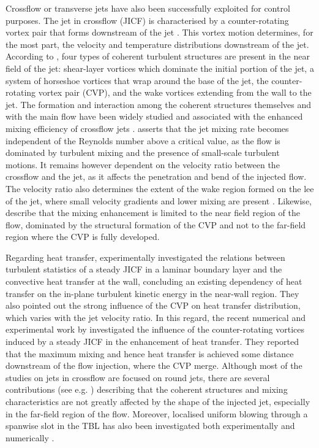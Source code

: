 Crossflow or transverse jets have also been successfully exploited for control purposes. The jet in crossflow (JICF) is characterised by a counter-rotating vortex pair that forms downstream of the jet \citep{kamotani1972experiments,kelso1996experimental}. This vortex motion determines, for the most part, the velocity and temperature distributions downstream of the jet. According to \citet{fric_roshko_1994}, four types of coherent turbulent structures are present in the near field of the jet: shear-layer vortices which dominate the initial portion of the jet, a system of horseshoe vortices that wrap around the base of the jet, the counter-rotating vortex pair (CVP), and the wake vortices extending from the wall to the jet. The formation and interaction among the coherent structures themselves and with the main flow have been widely studied \citep[see e.g.][]{cortelezzi2001formation, broadwell1984structure} and associated with the enhanced mixing efficiency of crossflow jets \citep{smith1998mixing}.  \citet{broadwell1984structure} asserts that the jet mixing rate becomes independent of the Reynolds number above a critical value, as the flow is dominated by turbulent mixing and the presence of small-scale turbulent motions. It remains however dependent on the velocity ratio between the crossflow and the jet, as it affects the penetration and bend of the injected flow. The velocity ratio also determines the extent of the wake region formed on the lee of the jet, where small velocity gradients and lower mixing are present \citep{andreopoulos1984experimental}. Likewise, \citet{smith1998mixing} describe that the mixing enhancement is limited to the near field region of the flow, dominated by the structural formation of the CVP and not to the far-field region where the CVP is fully developed. 

Regarding heat transfer, \citet{Carlomagno2004heatJICF} experimentally investigated the relations between turbulent statistics of a steady JICF in a laminar boundary layer and the convective heat transfer at the wall, concluding an existing dependency of heat transfer on the in-plane turbulent kinetic energy in the near-wall region. They also pointed out the strong influence of the CVP on heat transfer distribution, which varies with the jet velocity ratio. In this regard, the recent numerical and experimental work by \citet{puzu2019jet} investigated the influence of the counter-rotating vortices induced by a steady JICF in the enhancement of heat transfer. They reported that the maximum mixing and hence heat transfer is achieved some distance downstream of the flow injection, where the CVP merge.
Although most of the studies on jets in crossflow are focused on round jets, there are several contributions (see e.g. \citep{liscinsky1996crossflow,plesniak2005scalar}) describing that the coherent structures and mixing characteristics are not greatly affected by the shape of the injected jet, especially in the far-field region of the flow. Moreover, localised uniform blowing through a spanwise slot in the TBL has also been investigated both experimentally and numerically \citep[see e.g.][]{park1999, Krogstad2000slitjet}.

